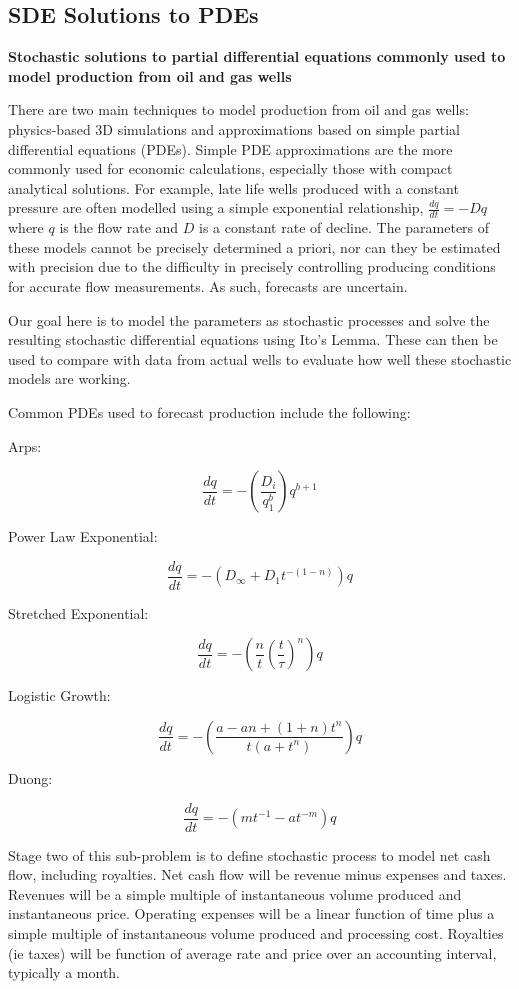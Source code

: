 \documentclass[12pt,a4paper]{article}
\begin{document}
\subsection{SDE Solutions to PDEs}

{\bf Stochastic solutions to partial differential equations commonly used to model production from oil and gas wells }

There are two main techniques to model production from oil and gas wells: physics-based 3D simulations and approximations based on simple partial differential equations (PDEs). Simple PDE approximations are the more commonly used for economic calculations, especially those with compact analytical solutions. For example, late life wells produced with a constant pressure are often modelled using a simple exponential relationship, $\frac{dq}{dt} = -D q$ where $q$ is the flow rate and $D$ is a constant rate of decline. The parameters of these models cannot be precisely determined a priori, nor can they be estimated with precision due to the difficulty in precisely controlling producing conditions for accurate flow measurements. As such, forecasts are uncertain. 

Our goal here is to model the parameters as stochastic processes and solve the resulting stochastic differential equations using Ito's Lemma. These can then be used to compare with data from actual wells to evaluate how well these stochastic models are working.

Common PDEs used to forecast production include the following:

Arps:

$$\frac{dq}{dt} = - \left( \frac{D_i}{q_1^b} \right) q^{b+1}$$

Power Law Exponential:

$$ \frac{dq}{dt} = - \left( D_\infty + D_1 t^{-(1-n)} \right) q$$

Stretched Exponential:

$$\frac{dq}{dt} = -\left( \frac{n}{t} \left( \frac{t}{\tau}\right)^n \right) q$$

Logistic Growth:

$$\frac{dq}{dt} = -\left( \frac{a-an+(1+n)t^n}{t\left(a+t^n\right)} \right) q$$

Duong:

$$\frac{dq}{dt} = -\left( mt^{-1}-at^{-m}\right) q$$

Stage two of this sub-problem is to define stochastic process to model net cash flow, including royalties. Net cash flow will be revenue minus expenses and taxes. Revenues will be a simple multiple of instantaneous volume produced and instantaneous price. Operating expenses will be a linear function of time plus a simple multiple of instantaneous volume produced and processing cost. Royalties (ie taxes) will be function of average rate and price over an accounting interval, typically a month.
\end{document}
